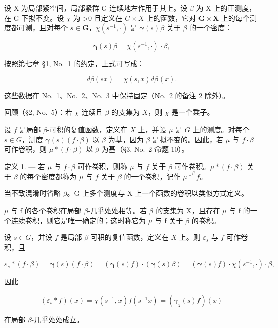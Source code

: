 设 X 为局部紧空间，局部紧群 G 连续地左作用于其上。设 \(\beta\) 为 X 上的正测度，在 G 下拟不变。设 \(\chi\) 为 \textgreater0 且定义在 \(G \times X\) 上的函数，它对 \(\mathbf{G} \times \mathbf{X}\) 上的每个测度都可测，且对每个 \(s \in \mathbf{G}\)，\(\chi(s^{-1}, \cdot)\) 是 \(\pmb{\gamma}(s)\beta\) 关于 \(\beta\) 的一个密度：

\[
\pmb {\gamma} (s) \beta = \chi (s ^ {- 1}, \cdot) \cdot \beta ,\tag{1}
\]

按照第七章 §1, No.~1 的约定，上式可写成：

\[
d \beta (s x) = \chi (s, x) d \beta (x).\tag{1'}
\]

这些数据在 No.~1、No.~2、No.~3 中保持固定（No.~2 的备注 2 除外）。

回顾（§2, No.~5）：若 \(\chi\) 连续且 \(\beta\) 的支集为 \(X\)，则 \(\chi\) 是一个乘子。

设 \(f\) 是局部 \(\beta\)-可积的复值函数，定义在 \(X\) 上，并设 \(\mu\) 是 \(G\) 上的测度。对每个 \(s \in G\)，测度 \(\boldsymbol{\gamma}(s)(f \cdot \beta)\) 以 \(\beta\) 为基，因为 \(\beta\) 是拟不变的。因此，若 \(\mu\) 与 \(f \cdot \beta\) 可作卷积，则 \(\mu * (f \cdot \beta)\) 以 \(\beta\) 为基（§3, No.~2 命题 10）。

定义 1. --- 若 \(\mu\) 与 \(f \cdot \beta\) 可作卷积，则称 \(\mu\) 与 \(f\) 关于 \(\beta\) 可作卷积。\(\mu * (f \cdot \beta)\) 关于 \(\beta\) 的每个密度都称为 \(\mu\) 与 \(f\) 关于 \(\beta\) 的一个卷积，记作 \(\mu * ^{\beta} f\)。

当不致混淆时省略 \(\beta\)。G 上多个测度与 X 上一个函数的卷积以类似方式定义。

\(\mu\) 与 f 的各个卷积在局部 \(\beta\)-几乎处处相等。若 \(\beta\) 的支集为 X，且存在 \(\mu\) 与 f 的一个连续卷积，则它是唯一确定的；这时称它为 \(\mu\) 与 f 关于 \(\beta\) 的卷积。

设 \(s \in G\)，并设 \(f\) 是局部 \(\beta\)-可积的复值函数，定义在 \(X\) 上。则 \(\varepsilon_s\) 与 \(f\) 可作卷积，且

\[
\varepsilon_ {s} * (f \cdot \beta) = \boldsymbol {\gamma} (s) (f \cdot \beta) = (\boldsymbol {\gamma} (s) f) \cdot (\boldsymbol {\gamma} (s) \beta) = (\boldsymbol {\gamma} (s) f) \cdot \chi (s ^ {- 1}, \cdot) \cdot \beta ,
\]

因此

\[
\left(\varepsilon_ {s} * f\right) (x) = \chi \left(s ^ {- 1}, x\right) f \left(s ^ {- 1} x\right) = \left(\gamma_ {\chi} (s) f\right) (x)\tag{2}
\]

在局部 \(\beta\)-几乎处处成立。

